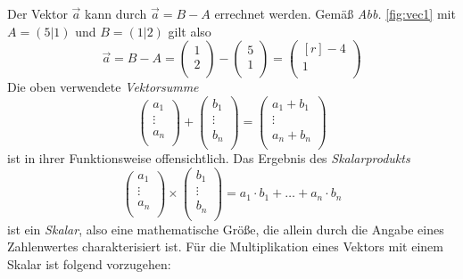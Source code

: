 \documentclass[twocolumn]{article}
\newcommand{\figref}[1]{\emph{Abb.} \ref{#1}}
\begin{document}
Der Vektor $\Vec{a}$ kann durch $\Vec{a} = B - A$ errechnet werden. Gemäß \figref{fig:vec1} mit $A = (5|1)$ und $B = (1|2)$ gilt also
%
\begin{equation*}
    \Vec{a} = B - A = \begin{pmatrix}1 \\ 2\\\end{pmatrix} - \begin{pmatrix}5 \\ 1\\\end{pmatrix} = \begin{pmatrix*}[r]-4 \\ 1\\\end{pmatrix*}
\end{equation*}
%
Die oben verwendete \emph{Vektorsumme}
%
\begin{equation*}
    \begin{pmatrix}a_1 \\ \vdots \\ a_n \\\end{pmatrix} + \begin{pmatrix}b_1 \\ \vdots \\ b_n \\\end{pmatrix} = \begin{pmatrix}a_1 + b_1 \\ \vdots \\ a_n + b_n \\\end{pmatrix}
\end{equation*}
%
ist in ihrer Funktionsweise offensichtlich. Das Ergebnis des \emph{Skalarprodukts}
%
\begin{equation*}
    \begin{pmatrix}a_1 \\ \vdots \\ a_n \\\end{pmatrix} \times \begin{pmatrix}b_1 \\ \vdots \\ b_n \\\end{pmatrix} = a_1 \cdot b_1 + \ldots + a_n \cdot b_n
\end{equation*}
%
ist ein \emph{Skalar}, also eine mathematische Größe, die allein durch die Angabe eines Zahlenwertes charakterisiert ist. Für die Multiplikation eines Vektors mit einem Skalar ist folgend vorzugehen:
\end{document}
